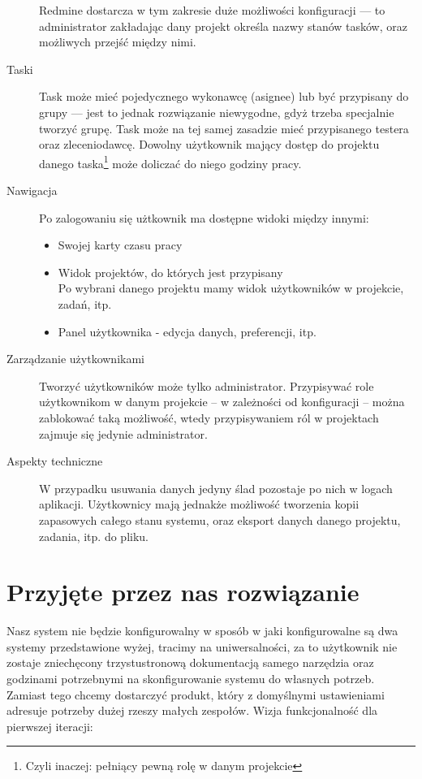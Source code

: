 \documentclass[a4paper,12pt,notitlepage]{mwrep}
\begin{document}
\begin{description}
		Redmine dostarcza w tym zakresie duże możliwości konfiguracji ---
		to administrator zakładając dany projekt określa nazwy stanów tasków, oraz możliwych przejść między nimi.
	\item[Taski]
		Task może mieć pojedycznego wykonawcę (asignee) lub być przypisany do grupy --- jest to jednak rozwiązanie niewygodne,
		gdyż trzeba specjalnie tworzyć grupę.
		Task może na tej samej zasadzie mieć przypisanego testera oraz zleceniodawcę.
		Dowolny użytkownik mający dostęp do projektu danego taska\footnote{Czyli inaczej: pełniący pewną rolę w danym projekcie}
		może doliczać do niego godziny pracy.
	\item[Nawigacja]
		Po zalogowaniu się użtkownik ma dostępne widoki między innymi:
		\begin{itemize}
			\item	Swojej karty czasu pracy
			\item	Widok projektów, do których jest przypisany\\
					Po wybrani danego projektu mamy widok użytkowników w projekcie, zadań, itp.
			\item	Panel użytkownika - edycja danych, preferencji, itp.
		\end{itemize}
	\item[Zarządzanie użytkownikami]
		Tworzyć użytkowników może tylko administrator. Przypisywać role użytkownikom w danym projekcie -- w zależności
		od konfiguracji -- można zablokować taką możliwość, wtedy przypisywaniem ról w projektach zajmuje się jedynie administrator.
	\item[Aspekty techniczne]
		W przypadku usuwania danych jedyny ślad pozostaje po nich w logach aplikacji.
		Użytkownicy mają jednakże możliwość tworzenia kopii zapasowych całego stanu systemu,
		oraz eksport danych danego projektu, zadania, itp. do pliku.
\end{description}




\section{Przyjęte przez nas rozwiązanie}
Nasz system nie będzie konfigurowalny w sposób w jaki konfigurowalne są dwa systemy przedstawione wyżej,
tracimy na uniwersalności, za to użytkownik nie zostaje zniechęcony trzystustronową dokumentacją
samego narzędzia oraz godzinami potrzebnymi na skonfigurowanie systemu do własnych potrzeb.\\
Zamiast tego chcemy dostarczyć produkt, który z domyślnymi ustawieniami adresuje potrzeby dużej rzeszy małych zespołów.\te
Wizja funkcjonalność dla pierwszej iteracji:
\end{document}
